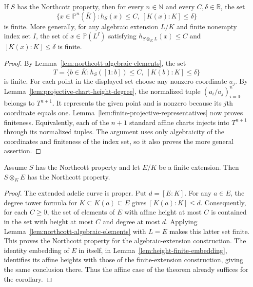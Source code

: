 \begin{theorem}
\label{thm:northcott}
\leanok
If $S$ has the Northcott property, then for every $n\in\mathbb N$
and every $C,\delta\in\mathbb R$, the set
\[
 \{x\in\mathbb P^n(\overline K):
       h_S(x)\leq C,\ [K(x):K]\leq\delta\}
\]
is finite.
More generally, for any algebraic extension $L/K$ and finite nonempty
index set $I$, the set of $x\in\mathbb P(L^I)$ satisfying
$h_{S\otimes_K L}(x)\leq C$ and $[K(x):K]\leq\delta$ is finite.
\end{theorem}
\begin{proof}
By Lemma~\ref{lem:northcott-algebraic-elements}, the set
\[
 T=\{b\in\overline K:
       h_S([1:b])\leq C,\ [K(b):K]\leq\delta\}
\]
is finite. For each point in the displayed set choose any nonzero
coordinate $a_j$. By Lemma~\ref{lem:projective-chart-height-degree},
the normalized tuple $(a_i/a_j)_{i=0}^n$ belongs to $T^{n+1}$.
It represents the given point and is nonzero because its $j$th
coordinate equals one. Lemma~\ref{lem:finite-projective-representatives}
now proves finiteness. Equivalently, each of the $n+1$ standard
affine charts injects into $T^{n+1}$ through its normalized tuples.
The argument uses only algebraicity of the coordinates and finiteness
of the index set, so it also proves the more general assertion.
\end{proof}

\begin{corollary}
\label{cor:northcott-finite-extension}
\leanok
Assume $S$ has the Northcott property and let $E/K$ be a finite
extension. Then $S\otimes_K E$ has the Northcott property.
\end{corollary}
\begin{proof}
The extended adelic curve is proper. Put $d=[E:K]$. For any
$a\in E$, the degree tower formula for $K\subseteq K(a)\subseteq E$
gives $[K(a):K]\leq d$. Consequently, for each $C\geq0$, the set
of elements of $E$ with affine height at most $C$ is contained in
the set with height at most $C$ and degree at most $d$. Applying
Lemma~\ref{lem:northcott-algebraic-elements} with $L=E$ makes
this latter set finite. This proves the Northcott property for the
algebraic-extension construction. The identity embedding of $E$ in
itself, in Lemma~\ref{lem:height-finite-embedding}, identifies its
affine heights with those of the finite-extension construction,
giving the same conclusion there. Thus the affine case of the
theorem already suffices for the corollary.
\end{proof}
